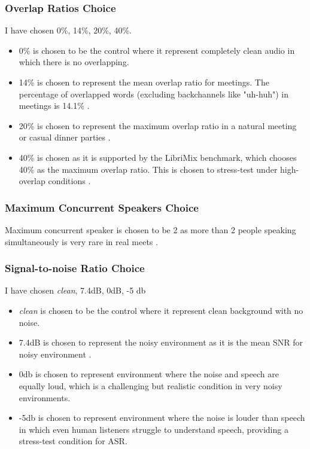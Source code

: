 \subsubsection{Overlap Ratios Choice}
I have chosen 0\%, 14\%, 20\%, 40\%.
\begin{itemize}
    \item 0\% is chosen to be the control where it represent completely clean audio in which there is no overlapping.
    \item 14\% is chosen to represent the mean overlap ratio for meetings. The percentage of overlapped words (excluding backchannels like "uh-huh") in meetings is 14.1\% \cite{Shriberg2001ObservationsOO}.
    \item 20\% is chosen to represent the maximum overlap ratio in a natural meeting or casual dinner parties \cite{chen2020continuousspeechseparationdataset} \cite{cosentino2020librimixopensourcedatasetgeneralizable}.
    \item 40\% is chosen as it is supported by the LibriMix benchmark, which chooses 40\% as the maximum overlap ratio. This is chosen to stress-test under high-overlap conditions \cite{chen2020continuousspeechseparationdataset}.
\end{itemize}

\subsubsection{Maximum Concurrent Speakers Choice}
Maximum concurrent speaker is chosen to be 2 as more than 2 people speaking simultaneously is very rare in real meets \cite{Handling_Trade-Offs_in_Speech_Separation_with_Sparsely-Gated_Mixture_of_Experts}.

\subsubsection{Signal-to-noise Ratio Choice}
I have chosen \textit{clean}, 7.4dB, 0dB, -5 db
\begin{itemize}
    \item \textit{clean} is chosen to be the control where it represent clean background with no noise.
    \item 7.4dB is chosen to represent the noisy environment as it is the mean SNR for noisy environment \cite{wu2018characteristics}.
    \item 0db is chosen to represent environment where the noise and speech are equally loud, which is a challenging but realistic condition in very noisy environments.
    \item -5db is chosen to represent environment where the noise is louder than speech in which even human listeners struggle to understand speech, providing a stress-test condition for ASR.
\end{itemize}

